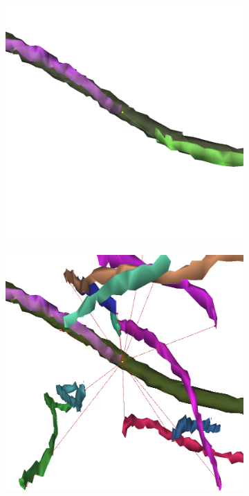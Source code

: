 \begin{figure}[htpb]
	\centering
	\begin{subfigure}[b]{0.3\textwidth}
		\centering
		\includegraphics[width=\textwidth]{data/images/matchingData/positive_2.png}
		\caption{\label{fig:positiveMatch}}
	\end{subfigure}
	\hspace{3mm}
	\begin{subfigure}[b]{0.3\textwidth}
		\centering
		\includegraphics[width=\textwidth]{data/images/matchingData/negative_2.png}

\end{subfigure}
\end{figure}
